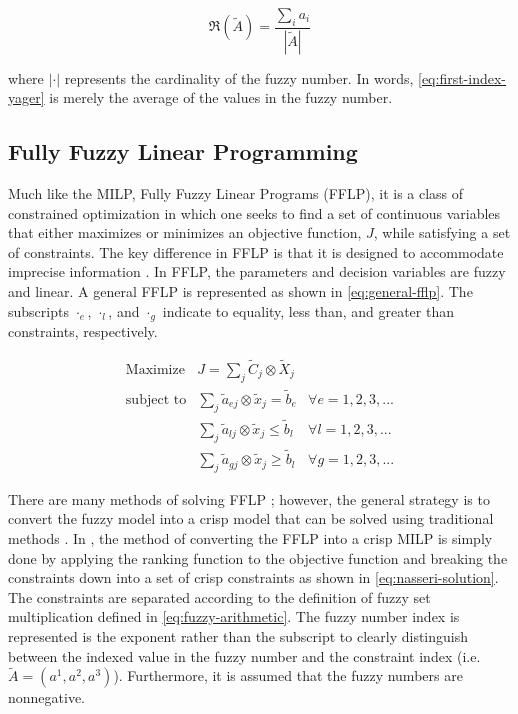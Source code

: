 \documentclass[11pt,a4paper,final]{article}
\let\ref\autoref                                      %
\begin{document}
\begin{equation}
\label{eq:first-index-yager}
\mathfrak{R}(\tilde{A}) = \frac{\sum_i a_i}{|\tilde{A}|}
\end{equation}

\noindent
where \(|\cdot|\) represents the cardinality of the fuzzy number. In words, \ref{eq:first-index-yager} is merely the average
of the values in the fuzzy number.

\subsection{Fully Fuzzy Linear Programming}
\label{sec:org0ab1c14}
Much like the MILP, Fully Fuzzy Linear Programs (FFLP), it is a class of constrained optimization in which one seeks to
find a set of continuous variables that either maximizes or minimizes an objective function, \(J\), while satisfying a set
of constraints. The key difference in FFLP is that it is designed to accommodate imprecise information
\cite{bello-2019-fuzzy-activ,kaur-2016-introd-fuzzy}. In FFLP, the parameters and decision variables are fuzzy and
linear. A general FFLP is represented as shown in \ref{eq:general-fflp}. The subscripts \(\cdot_e\), \(\cdot_l\), and \(\cdot_g\) indicate to
equality, less than, and greater than constraints, respectively.

\begin{equation}
\label{eq:general-fflp}
\begin{array}{lll}
\text{Maximize}   & J = \sum_j \tilde{C}_j \otimes \tilde{X}_j              &                 \\
\text{subject to} & \sum_j \tilde{a}_{ej} \otimes \tilde{x}_j = \tilde{b}_e &  \forall e = 1,2,3,... \\
                  & \sum_j \tilde{a}_{lj} \otimes \tilde{x}_j \le \tilde{b}_l &  \forall l = 1,2,3,... \\
                  & \sum_j \tilde{a}_{gj} \otimes \tilde{x}_j \ge \tilde{b}_l &  \forall g = 1,2,3,...
\end{array}
\end{equation}

There are many methods of solving FFLP
\cite{bello-2019-fuzzy-activ,kaur-2016-introd-fuzzy,ebrahimnejad-2016-new-method,nasseri-2013-fully}; however, the
general strategy is to convert the fuzzy model into a crisp model that can be solved using traditional methods
\cite{bello-2019-fuzzy-activ}. In \cite{nasseri-2013-fully,bello-2019-fuzzy-activ}, the method of converting the FFLP
into a crisp MILP is simply done by applying the ranking function to the objective function and breaking the constraints
down into a set of crisp constraints as shown in \ref{eq:nasseri-solution}. The constraints are separated according to the
definition of fuzzy set multiplication defined in \ref{eq:fuzzy-arithmetic}. The fuzzy number index is represented is the
exponent rather than the subscript to clearly distinguish between the indexed value in the fuzzy number and the
constraint index (i.e. \(\tilde{A} = (a^1,a^2,a^3)\)). Furthermore, it is assumed that the fuzzy numbers are nonnegative.
\end{document}
